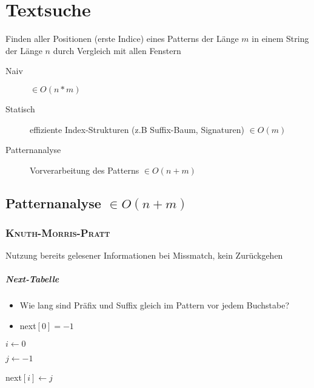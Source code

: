 \chapter{Textsuche}

Finden aller Positionen (erste Indice) eines Patterns der Länge $m$ in einem String der Länge $n$ durch Vergleich mit allen Fenstern

\begin{description}
  \item [Naiv] $\in O(n * m)$

  \item [Statisch] effiziente Index-Strukturen (z.B Suffix-Baum, Signaturen) $\in O(m)$

  \item [Patternanalyse] Vorverarbeitung des Patterns $\in O(n + m)$
\end{description}

\section[Patternanalyse]{Patternanalyse $\in O(n + m)$}

\subsection{\textsc{Knuth-Morris-Pratt}}

Nutzung bereits gelesener Informationen bei Missmatch, kein Zurückgehen

\paragraph{Next-Tabelle}

\begin{itemize}
  \item Wie lang sind Präfix und Suffix gleich im Pattern vor jedem Buchstabe?
  \item next$[0] = -1$
\end{itemize}


\begin{algorithm}[H]


  $i \leftarrow 0$

  $j \leftarrow -1$

  next$[i] \leftarrow j$

\end{algorithm}

